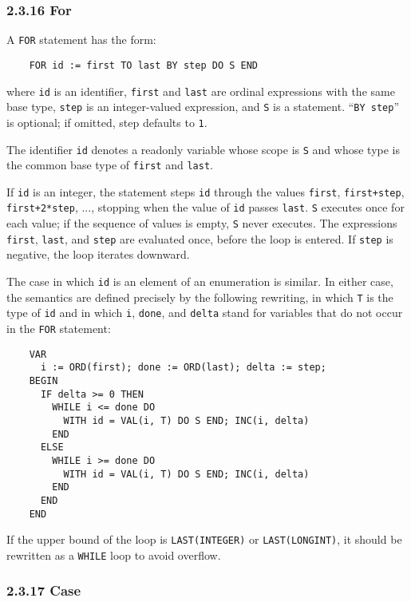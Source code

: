 \documentclass[10pt]{article}
\begin{document}
\subsubsection*{2.3.16 For}

A \verb|FOR| statement has the form:
\begin{verbatim}
    FOR id := first TO last BY step DO S END
\end{verbatim}
where \verb|id| is an identifier, \verb|first| and \verb|last| are ordinal
expressions with the same base type, \verb|step| is an integer-valued
expression, and \verb|S| is a statement.  ``\verb|BY step|'' is optional; if
omitted, step defaults to \verb|1|.

The identifier \verb|id| denotes a readonly variable whose scope is \verb|S|
and whose type is the common base type of \verb|first| and \verb|last|.

If \verb|id| is an integer, the statement steps \verb|id| through the values
\verb|first|, \verb|first+step|, \verb|first+2*step|, ..., stopping when the
value of \verb|id| passes \verb|last|.  \verb|S| executes once for each value;
if the sequence of values is empty, \verb|S| never executes.  The expressions
\verb|first|, \verb|last|, and \verb|step| are evaluated once, before the loop
is entered.  If \verb|step| is negative, the loop iterates downward.

The case in which \verb|id| is an element of an enumeration is similar.  In
either case, the semantics are defined precisely by the following rewriting,
in which \verb|T| is the type of \verb|id| and in which \verb|i|, \verb|done|,
and \verb|delta| stand for variables that do not occur in the \verb|FOR|
statement:
\begin{verbatim}
    VAR
      i := ORD(first); done := ORD(last); delta := step;
    BEGIN
      IF delta >= 0 THEN
        WHILE i <= done DO
          WITH id = VAL(i, T) DO S END; INC(i, delta)
        END
      ELSE
        WHILE i >= done DO
          WITH id = VAL(i, T) DO S END; INC(i, delta)
        END
      END
    END
\end{verbatim}

If the upper bound of the loop is \verb|LAST(INTEGER)| or
\verb|LAST(LONGINT)|, it should be rewritten as a \verb|WHILE| loop to avoid
overflow.

\subsubsection*{2.3.17 Case}
\end{document}
